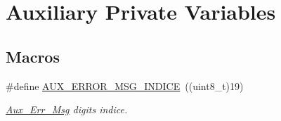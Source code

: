 \hypertarget{group___k_n_x___aux___private___variables}{}\section{Auxiliary Private Variables}
\label{group___k_n_x___aux___private___variables}
\subsection*{Macros}
\begin{DoxyCompactItemize}
\item 
\#define \hyperlink{group___k_n_x___aux___private___variables_ga18ae1c752b89b0190c4adbff64c7e36e}{A\+U\+X\+\_\+\+E\+R\+R\+O\+R\+\_\+\+M\+S\+G\+\_\+\+I\+N\+D\+I\+CE}~((uint8\+\_\+t)19)\hypertarget{group___k_n_x___aux___private___variables_ga18ae1c752b89b0190c4adbff64c7e36e}{}\label{group___k_n_x___aux___private___variables_ga18ae1c752b89b0190c4adbff64c7e36e}

\begin{DoxyCompactList}\small\item\em \hyperlink{group___k_n_x___aux___private___variables_gab56635544aea253fe5a75ded7dda1b2f}{Aux\+\_\+\+Err\+\_\+\+Msg} digits indice. \end{DoxyCompactList}\end{DoxyCompactItemize}
